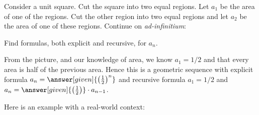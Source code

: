 \documentclass{ximera}
\begin{document}
\begin{example}
  Consider a unit square. Cut the square into two equal regions. Let
  $a_1$ be the area of one of the regions. Cut the other region into
  two equal regions and let $a_2$ be the area of one of these
  regions. Continue on \textit{ad-infinitium}:
  \begin{image}[2in]
  \end{image}
  Find formulas, both explicit and recursive, for $a_n$.
  \begin{explanation}
    From the picture, and our knowledge of area, we know $a_1 = 1/2$
    and that every area is half of the previous area. Hence this is a
    geometric sequence with explicit formula $a_n =
    \answer[given]{\left(\frac{1}{2}\right)^{n}}$ and recursive
    formula $a_1 = 1/2$ and $a_n =
    \answer[given]{\left(\frac{1}{2}\right)}\cdot a_{n-1}$.
  \end{explanation}
\end{example}

Here is an example with a real-world context:
\end{document}
